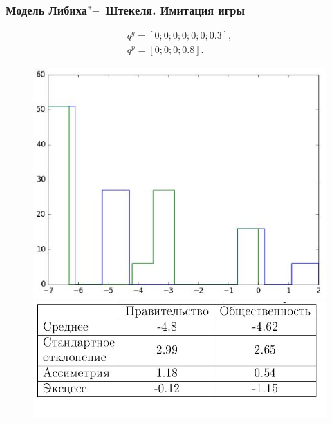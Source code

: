 \documentclass {beamer}
\begin{document}
\begin{frame}
\frametitle{Модель Либиха"--~Штекеля. Имитация игры}
 \begin{gather*}
 q^g = \left[ 0; 0; 0; 0; 0; 0; 0.3 \right], \\
 q^p = \left[ 0; 0; 0; 0.8 \right].
 \end{gather*}
	\begin{figure}
		\begin{minipage}[b]{0.45\textwidth}
			
			\includegraphics[width=\textwidth]{12th}
		\end{minipage}
		\begin{minipage}[b]{0.45\textwidth}
			
			\includegraphics[width=\textwidth]{13th}
		\end{minipage}
		
	\end{figure}
	
\end{frame}
\end{document}
